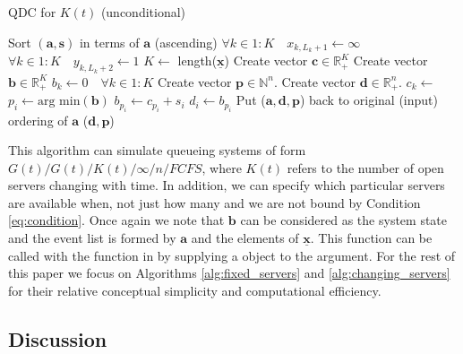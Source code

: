 \documentclass[article]{jss}
\begin{document}
\begin{algorithm}[ht!]
\caption{QDC for $K(t)$ (unconditional)}
\label{alg:changing_servers_unconditional} 
\begin{algorithmic}[1]
\State Sort $(\mathbf{a}, \mathbf{s})$ in terms of $\mathbf{a}$ (ascending)
\State $\forall k \in 1:K \quad x_{k,L_k+1} \leftarrow \infty$
\State $\forall k \in 1:K \quad y_{k,L_k+2} \leftarrow 1$
\State $K \leftarrow $ length($\mathbf{\underline{x}}$)
\State Create vector $\mathbf{c} \in \mathbb{R}_{\text{+}}^{K}$
\State Create vector $\mathbf{b} \in \mathbb{R}_{\text{+}}^{K}$
\State $b_k \leftarrow 0 \quad \forall k \in 1:K$
\State Create vector $\mathbf{p} \in \mathbb{N}^{n}$.
\State Create vector $\mathbf{d} \in \mathbb{R}_{+}^{n}$.
        \State $c_k \leftarrow$ 
    \EndFor
\State $p_i \leftarrow \text{arg min}(\mathbf{b}) $
\State $b_{p_i} \leftarrow c_{p_i} + s_i $
\State $d_i \leftarrow b_{p_i}$ 
\EndFor 
\State Put ($\mathbf{a}, \mathbf{d}, \mathbf{p}$) back to original (input) ordering of $\mathbf{a}$ 
\State \Return ($\mathbf{d}, \mathbf{p}$)
\EndFunction
\end{algorithmic}
\end{algorithm}

This algorithm can simulate queueing systems of form $G(t)/G(t)/K(t)/\infty/n/FCFS$, where $K(t)$ refers to the number of open servers changing with time. In addition, we can specify which particular servers are available when, not just how many and we are not bound by Condition \ref{eq:condition}. Once again we note that $\mathbf{b}$ can be considered as the system state and the event list is formed by $\mathbf{a}$ and the elements of $\mathbf{\underline{x}}$. This function can be called with the  function in  by supplying a  object to the  argument. For the rest of this paper we focus on Algorithms \ref{alg:fixed_servers} and \ref{alg:changing_servers} for their relative conceptual simplicity and computational efficiency.

\subsection{Discussion}
\end{document}
